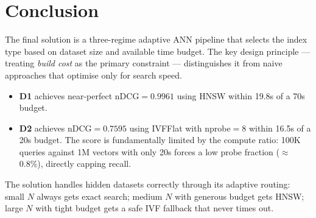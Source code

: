 \documentclass[11pt,a4paper]{article}
\begin{document}
\section{Conclusion}

The final solution is a three-regime adaptive ANN pipeline that selects the
index type based on dataset size and available time budget. The key design
principle — treating \emph{build cost} as the primary constraint — distinguishes
it from naive approaches that optimise only for search speed.

\begin{itemize}[leftmargin=1.5em]
  \item \textbf{D1} achieves near-perfect nDCG$=0.9961$ using HNSW within
        19.8s of a 70s budget.
  \item \textbf{D2} achieves nDCG$=0.7595$ using IVFFlat with nprobe$=8$
        within 16.5s of a 20s budget. The score is fundamentally limited by
        the compute ratio: 100K queries against 1M vectors with only 20s
        forces a low probe fraction ($\approx$0.8\%), directly capping recall.
\end{itemize}

The solution handles hidden datasets correctly through its adaptive routing:
small $N$ always gets exact search; medium $N$ with generous budget gets HNSW;
large $N$ with tight budget gets a safe IVF fallback that never times out.

\end{document}
